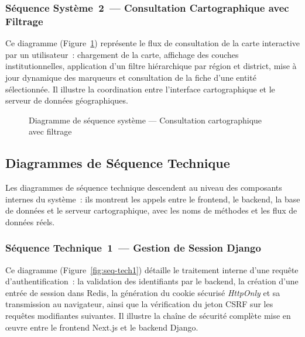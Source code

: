 \subsubsection{Séquence Système~2~--- Consultation Cartographique avec Filtrage}

Ce diagramme (Figure~\ref{fig:seq-sys2}) représente le flux de consultation
de la carte interactive par un utilisateur~: chargement de la carte, affichage
des couches institutionnelles, application d'un filtre hiérarchique par région
et district, mise à jour dynamique des marqueurs et consultation de la fiche
d'une entité sélectionnée. Il illustre la coordination entre l'interface
cartographique et le serveur de données géographiques.

\begin{figure}[H]
  \centering
  \caption{Diagramme de séquence système --- Consultation cartographique avec filtrage}
  \label{fig:seq-sys2}
\end{figure}

\subsection{Diagrammes de Séquence Technique}
\label{ssec:seq-technique}

Les diagrammes de séquence technique descendent au niveau des composants
internes du système~: ils montrent les appels entre le frontend, le backend,
la base de données et le serveur cartographique, avec les noms de méthodes
et les flux de données réels.

\subsubsection{Séquence Technique~1~--- Gestion de Session Django}

Ce diagramme (Figure~\ref{fig:seq-tech1}) détaille le traitement interne
d'une requête d'authentification~: la validation des identifiants par le
backend, la création d'une entrée de session dans Redis, la génération du
cookie sécurisé \textit{HttpOnly} et sa transmission au navigateur, ainsi
que la vérification du jeton CSRF sur les requêtes modifiantes suivantes.
Il illustre la chaîne de sécurité complète mise en œuvre entre le frontend
Next.js et le backend Django.

